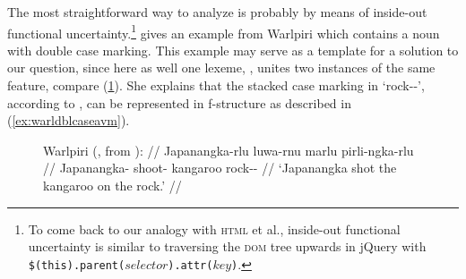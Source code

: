 
The most straightforward way to analyze  is
probably by means of inside-out functional uncertainty.\footnote{To come back
to our analogy with \textsc{html} et al., inside-out functional uncertainty is
similar to traversing the \textsc{dom} tree upwards in jQuery with
\texttt{\$(this).parent($selector$).attr($key$)}.} \citet[144]{dalrymple2001}
gives an example from Warlpiri which contains a noun with double case marking.
This example may serve as a template for a solution to our question, since here
as well one lexeme, , unites two instances of the same
feature, compare (\ref{ex:warldblcase}). She explains that the stacked case
marking in  `rock-\Loc {}-\Erg{}', according to
\citet{nordlinger1998}, can be represented in f-structure as described in
(\ref{ex:warldblcaseavm}).

\begin{figure}[h]
\ex\label{ex:warldblcase}
\begingl
	\glpreamble Warlpiri (\cite[136]{nordlinger1998}, from 
		\cite{simpson1991}): //
	\gla Japanangka-rlu luwa-rnu marlu pirli-ngka-rlu //
	\glb Japanangka-\Erg{} shoot-\Pst{} kangaroo rock-\Loc{}-\Erg{} //
	\glft `Japanangka shot the kangaroo on the rock.' //
\endgl\xe
\end{figure}


